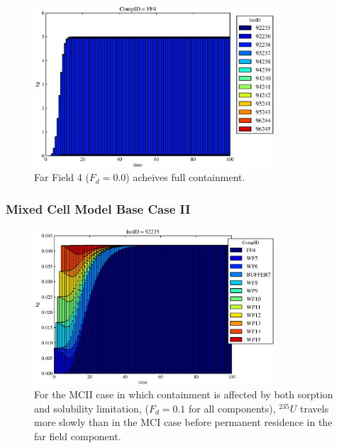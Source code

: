 \begin{frame}[ctb!]
\begin{figure}[htbp!]
\begin{minipage}[b]{0.45\linewidth}
  \includegraphics[width=0.8\textwidth]{./images/mcI0.eps}
  \caption[Case MCI Waste Package Contaminants.]{ 
    Far Field 4 ($F_d = 0.0$) acheives full containment.
    }
  \label{fig:mcIff0}


  \end{minipage}
\end{figure}
\end{frame}

\begin{frame}[ctb!]
  \frametitle{Mixed Cell Model Base Case II}
\begin{figure}[ht]
\centering
\includegraphics[width=0.8\textwidth]{./images/mcIII.eps}
\caption[$^{235}U$ residence. Mixed Cell Coupled Sorption and Solubility Limitation.]{
For the MCII case in which containment is affected by both sorption and 
solubility limitation,
($F_{d}=0.1$ for all components), $^{235}U$ travels more slowly than in the MCI case 
before permanent residence in the far field component.
}
\label{fig:mcIIIall}
\end{figure}
\end{frame}

